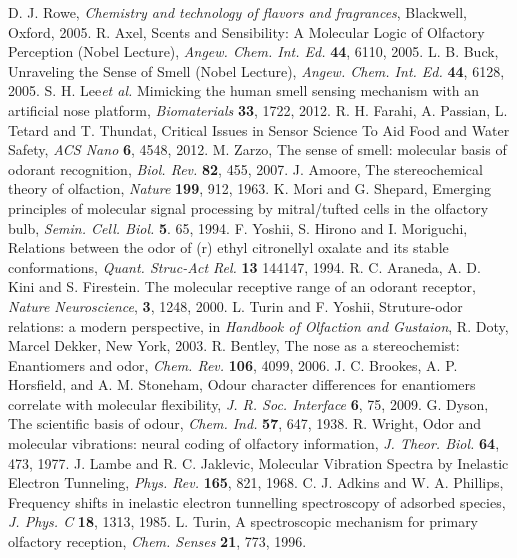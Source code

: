 \documentclass[aps,prl,tightenlines,onecolumn,superscriptaddress]{revtex4}
\begin{document}
\begin{thebibliography}{1}
 D. J. Rowe, {\it Chemistry and technology of flavors and fragrances}, Blackwell, Oxford, 2005.
 R. Axel, Scents and Sensibility: A Molecular Logic of Olfactory Perception (Nobel Lecture), {\it Angew. Chem. Int. Ed.} {\bf 44}, 6110, 2005.
 L. B. Buck, Unraveling the Sense of Smell (Nobel Lecture), {\it Angew. Chem. Int. Ed.} {\bf 44}, 6128, 2005.
 S. H. Lee{\it et al.} Mimicking the human smell sensing mechanism with an artificial nose platform, {\it Biomaterials} {\bf 33}, 1722, 2012.
 R. H. Farahi, A. Passian, L. Tetard and T. Thundat, Critical Issues in Sensor Science To Aid Food and Water Safety, {\it ACS
Nano} {\bf 6}, 4548, 2012.
 M. Zarzo, The sense of smell: molecular basis of odorant recognition, {\it Biol. Rev.} {\bf 82}, 455, 2007.
 J. Amoore, The stereochemical theory of olfaction, {\it Nature} {\bf 199}, 912, 1963.
 K. Mori and G. Shepard, Emerging principles of molecular signal processing by mitral/tufted cells in the olfactory bulb, {\it Semin. Cell. Biol.} {\bf 5}. 65, 1994.
 F. Yoshii, S. Hirono and I. Moriguchi, Relations between the odor of (r) ethyl citronellyl oxalate and its stable conformations, {\it Quant. Struc-Act Rel.} {\bf 13} 144147, 1994.
 R. C. Araneda, A. D. Kini and S. Firestein. The molecular receptive range of an odorant receptor, {\it Nature Neuroscience}, {\bf 3}, 1248, 2000.
 L. Turin and F. Yoshii, Struture-odor relations: a modern perspective, in {\it Handbook of Olfaction and Gustaion}, R. Doty, Marcel Dekker, New York, 2003.
 R. Bentley, The nose as a stereochemist: Enantiomers and odor, {\it Chem. Rev.} {\bf 106}, 4099, 2006.
 J. C. Brookes, A. P. Horsfield, and A. M. Stoneham, Odour character differences for enantiomers correlate with molecular flexibility, {\it J. R. Soc. Interface} {\bf 6}, 75, 2009.
 G. Dyson, The scientific basis of odour, {\it Chem. Ind.} {\bf 57}, 647, 1938.
 R. Wright, Odor and molecular vibrations: neural coding of olfactory information, {\it J. Theor. Biol.} {\bf 64}, 473, 1977.
 J. Lambe and R. C. Jaklevic, Molecular Vibration Spectra by Inelastic Electron Tunneling, {\it Phys. Rev.} {\bf 165}, 821, 1968.
 C. J. Adkins and W. A. Phillips, Frequency shifts in inelastic electron tunnelling spectroscopy of adsorbed species, {\it J. Phys. C} {\bf 18}, 1313, 1985.
 L. Turin, A spectroscopic mechanism for primary olfactory reception, {\it Chem. Senses} {\bf 21}, 773, 1996.

\end{thebibliography}
\end{document}
